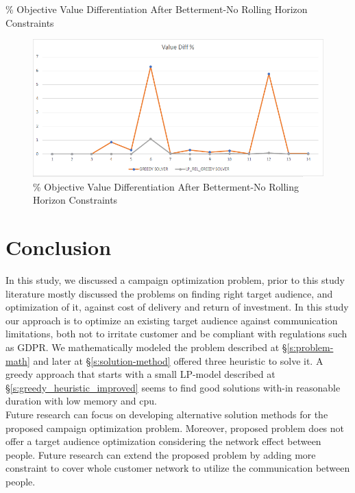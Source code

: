 \documentclass[11pt]{article}
\begin{document}
{\begin{landscape}
        \begin{table}[htb]
                \centering
                \caption[Short Caption for LoT]{\% Objective Value Differentiation After Betterment-No Rolling Horizon Constraints}\label{table:tbl_test_obj_diff_bett_no_rh}
        \end{table}
        \begin{figure}[htp]
            \centering
            \includegraphics[width=12cm]{value_diff_bett_no_rh}
            \caption{\% Objective Value Differentiation After Betterment-No Rolling Horizon Constraints}
            \label{fig:fig_value_diff_bett_no_rh}
        \end{figure}
    \end{landscape}
    \clearpage%
}


\newpage

\section{Conclusion} \label{s:conclusion}
In this study, we discussed a campaign optimization problem, prior to this study literature mostly discussed the problems on finding right target audience, and optimization of it, against cost of delivery and return of investment. In this study our approach is to optimize an existing target audience against communication limitations, both not to irritate customer and be compliant with regulations such as GDPR. We mathematically modeled the problem described at \S \ref{s:problem-math} and later at \S \ref{s:solution-method} offered three heuristic to solve it. A greedy approach that starts with a small LP-model described at \S \ref{s:greedy_heuristic_improved} seems to find good solutions with-in reasonable duration with low memory and cpu.\\
Future research can focus on developing alternative solution methods for the proposed campaign optimization problem. Moreover, proposed problem does not offer a target audience optimization considering the network effect between people. Future research can extend the proposed problem by adding more constraint to cover whole customer network to utilize the communication between people.

\newpage



\end{document}
